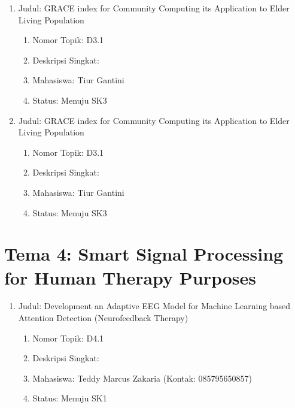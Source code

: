\documentclass[
  letterpaper,
  DIV=11,
  numbers=noendperiod]{scrreprt}
\providecommand{\tightlist}{%
  \setlength{\itemsep}{0pt}\setlength{\parskip}{0pt}}
\begin{document}
\begin{enumerate}
\def\labelenumi{\arabic{enumi}.}
\tightlist
\item
  Judul: GRACE index for Community Computing its Application to Elder
  Living Population

  \begin{enumerate}
  \def\labelenumii{\arabic{enumii}.}
  \tightlist
  \item
    Nomor Topik: D3.1
  \item
    Deskripsi Singkat:
  \item
    Mahasiswa: Tiur Gantini
  \item
    Status: Menuju SK3
  \end{enumerate}
\item
  Judul: GRACE index for Community Computing its Application to Elder
  Living Population

  \begin{enumerate}
  \def\labelenumii{\arabic{enumii}.}
  \tightlist
  \item
    Nomor Topik: D3.1
  \item
    Deskripsi Singkat:
  \item
    Mahasiswa: Tiur Gantini
  \item
    Status: Menuju SK3
  \end{enumerate}
\end{enumerate}

\section{Tema 4: Smart Signal Processing for Human Therapy
Purposes}\label{tema-4-smart-signal-processing-for-human-therapy-purposes}

\begin{enumerate}
\def\labelenumi{\arabic{enumi}.}
\tightlist
\item
  Judul: Development an Adaptive EEG Model for Machine Learning based
  Attention Detection (Neurofeedback Therapy)

  \begin{enumerate}
  \def\labelenumii{\arabic{enumii}.}
  \tightlist
  \item
    Nomor Topik: D4.1
  \item
    Deskripsi Singkat:
  \item
    Mahasiswa: Teddy Marcus Zakaria (Kontak: 085795650857)
  \item
    Status: Menuju SK1
  \end{enumerate}
\end{enumerate}
\end{document}
